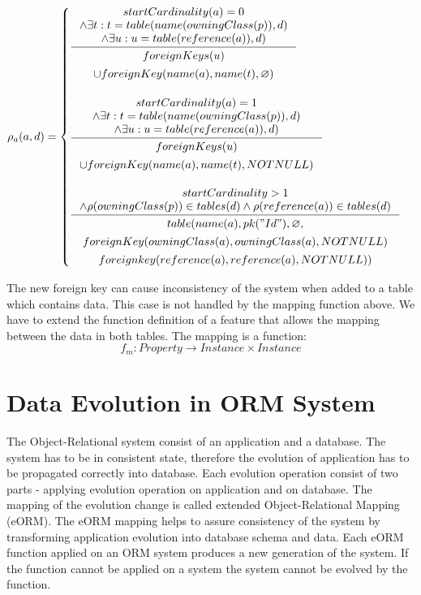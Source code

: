\documentclass[11pt]{article}
\begin{document}
$
\rho_a(a,d) = \begin{cases}
 \inference{ startCardinality(a) = 0 \\ \wedge \exists t : t = table(name(owningClass(p)), d) \\ \wedge \exists u : u = table(reference(a)), d)}{ 
 \begin{gathered}
 foreignKeys(u) \\ \cup foreignKey(name(a), name(t),  \varnothing) 
 \end{gathered}
 }
  \\ \\
 \inference{ startCardinality(a) = 1 \\ \wedge \exists t : t = table(name(owningClass(p)), d) \\ \wedge \exists u : u = table(reference(a)), d)}{\begin{gathered}  
foreignKeys(u) \\ \cup  foreignKey(name(a), name(t),  NOTNULL) \\
\end{gathered}
} \\ \\
 
  \inference{  startCardinality > 1 \\ \wedge \rho(owningClass(p)) \in tables(d) \wedge \rho(reference(a)) \in tables(d)}{
  \begin{gathered}  
 table(name(a), pk("Id"), \varnothing, \\ foreignKey(owningClass(a),owningClass(a), NOTNULL) \\ foreignkey(reference(a), reference(a), NOTNULL)) 
  \end{gathered}}  
 \end{cases}
$


The new foreign key can cause inconsistency of the system when added to a table which contains data. This case is not handled by the mapping function above. We have to extend the function definition of a feature that allows the mapping between the data in both tables. The mapping is a function:
$$f_m : Property \rightarrow Instance \times Instance $$




\section{Data Evolution in ORM System}
The Object-Relational system consist of an application and a database. The system has to be in consistent state, therefore the evolution of application has to be propagated correctly into database. Each evolution operation consist of two parts - applying evolution operation on application and on database. The mapping of the evolution change is called extended Object-Relational Mapping (eORM). The eORM mapping helps to assure consistency of the system by transforming application evolution into database schema and data. Each eORM function applied on an ORM system produces a new generation of the system. If the function cannot be applied on a system the system cannot be evolved by the function. 
\end{document}
